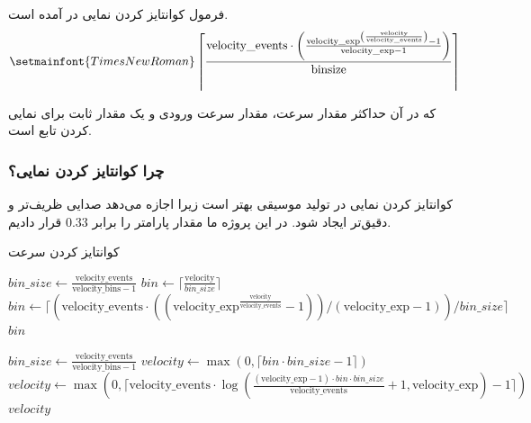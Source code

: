 فرمول کوانتایز کردن نمایی در  آمده است.
\begin{equation}
\setmainfont{Times New Roman}
\left\lceil \frac{ \text{velocity\_events} \cdot \left( \frac{ \text{velocity\_exp}^{\left( \frac{\text{velocity}}{\text{velocity\_events}} \right)} - 1 }{ \text{velocity\_exp} - 1 } \right) }{ \text{binsize} } \right\rceil
\label{Eq:quinz}
\end{equation}\vspace{-\baselineskip}


که در آن  حداکثر مقدار سرعت،  مقدار سرعت ورودی و
 یک مقدار ثابت برای نمایی کردن تابع است.

\subsubsection{چرا کوانتایز کردن
      نمایی؟}
کوانتایز کردن نمایی در تولید موسیقی بهتر است زیرا اجازه می‌دهد صدایی
ظریف‌تر و دقیق‌تر ایجاد شود. در این پروژه ما مقدار پارامتر  را برابر $0.33$ قرار دادیم.

\begin{LTR}
      \begin{algorithm}
            \caption{کوانتایز کردن سرعت}
            \label{alg:velocity_quantization}
            \begin{algorithmic}
                  \setmainfont{Times New Roman}
                  \State $bin\_size \gets \frac{\text{velocity\_events}}{\text{velocity\_bins} - 1}$
                  \State $bin \gets \lceil \frac{\text{velocity}}{bin\_size} \rceil$
                  \Else
                  \State $bin \gets \lceil \left( \text{velocity\_events} \cdot \left( \left( \text{velocity\_exp}^{ \frac{\text{velocity}}{\text{velocity\_events}} } - 1 \right) \right) / (\text{velocity\_exp} - 1) \right) / bin\_size \rceil$
                  \EndIf
                  \State \Return $bin$
                  \EndProcedure

                  \State $bin\_size \gets \frac{\text{velocity\_events}}{\text{velocity\_bins} - 1}$
                  \State $velocity \gets \max(0, \lceil bin \cdot bin\_size - 1 \rceil)$
                  \Else
                  \State $velocity \gets \max(0, \lceil \text{velocity\_events} \cdot \log \left( \frac{(\text{velocity\_exp} - 1) \cdot bin \cdot bin\_size}{\text{velocity\_events}} + 1, \text{velocity\_exp} \right) - 1 \rceil)$
                  \EndIf
                  \State \Return $velocity$
                  \EndProcedure
            \end{algorithmic}
      \end{algorithm}
\end{LTR}

